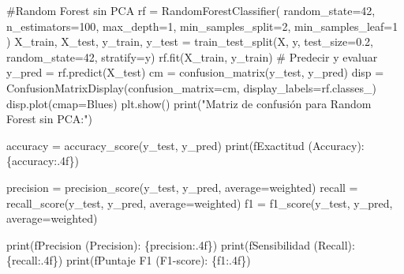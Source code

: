 \documentclass[
  letterpaper,
  DIV=11,
  numbers=noendperiod]{scrartcl}
\newenvironment{Shaded}{\begin{snugshade}}{\end{snugshade}}
\newcommand{\BuiltInTok}[1]{\textcolor[rgb]{0.00,0.23,0.31}{#1}}
\newcommand{\CommentTok}[1]{\textcolor[rgb]{0.37,0.37,0.37}{#1}}
\newcommand{\DecValTok}[1]{\textcolor[rgb]{0.68,0.00,0.00}{#1}}
\newcommand{\FloatTok}[1]{\textcolor[rgb]{0.68,0.00,0.00}{#1}}
\newcommand{\NormalTok}[1]{\textcolor[rgb]{0.00,0.23,0.31}{#1}}
\newcommand{\OperatorTok}[1]{\textcolor[rgb]{0.37,0.37,0.37}{#1}}
\newcommand{\SpecialCharTok}[1]{\textcolor[rgb]{0.37,0.37,0.37}{#1}}
\newcommand{\SpecialStringTok}[1]{\textcolor[rgb]{0.13,0.47,0.30}{#1}}
\newcommand{\StringTok}[1]{\textcolor[rgb]{0.13,0.47,0.30}{#1}}
\begin{document}
\begin{Shaded}
\begin{Highlighting}[]
\CommentTok{\#Random Forest sin PCA}
\NormalTok{rf }\OperatorTok{=}\NormalTok{ RandomForestClassifier(}
\NormalTok{  random\_state}\OperatorTok{=}\DecValTok{42}\NormalTok{, n\_estimators}\OperatorTok{=}\DecValTok{100}\NormalTok{,}
\NormalTok{  max\_depth}\OperatorTok{=}\DecValTok{1}\NormalTok{,}
\NormalTok{  min\_samples\_split}\OperatorTok{=}\DecValTok{2}\NormalTok{,}
\NormalTok{  min\_samples\_leaf}\OperatorTok{=}\DecValTok{1}
\NormalTok{)}
\NormalTok{X\_train, X\_test, y\_train, y\_test }\OperatorTok{=}
\NormalTok{  train\_test\_split(X, y, test\_size}\OperatorTok{=}\FloatTok{0.2}\NormalTok{, random\_state}\OperatorTok{=}\DecValTok{42}\NormalTok{, stratify}\OperatorTok{=}\NormalTok{y)}
\NormalTok{rf.fit(X\_train, y\_train)}
\CommentTok{\# Predecir y evaluar}
\NormalTok{y\_pred }\OperatorTok{=}\NormalTok{ rf.predict(X\_test)}
\NormalTok{cm }\OperatorTok{=}\NormalTok{ confusion\_matrix(y\_test, y\_pred)}
\NormalTok{disp }\OperatorTok{=}\NormalTok{ ConfusionMatrixDisplay(confusion\_matrix}\OperatorTok{=}\NormalTok{cm, display\_labels}\OperatorTok{=}\NormalTok{rf.classes\_)}
\NormalTok{disp.plot(cmap}\OperatorTok{=}\StringTok{\textquotesingle{}Blues\textquotesingle{}}\NormalTok{)}
\NormalTok{plt.show()}
\BuiltInTok{print}\NormalTok{(}\StringTok{"Matriz de confusión para Random Forest sin PCA:"}\NormalTok{)}

\NormalTok{accuracy }\OperatorTok{=}\NormalTok{ accuracy\_score(y\_test, y\_pred)}
\BuiltInTok{print}\NormalTok{(}\SpecialStringTok{f\textquotesingle{}Exactitud (Accuracy): }\SpecialCharTok{\{}\NormalTok{accuracy}\SpecialCharTok{:.4f\}}\SpecialStringTok{\textquotesingle{}}\NormalTok{)}

\NormalTok{precision }\OperatorTok{=}\NormalTok{ precision\_score(y\_test, y\_pred, average}\OperatorTok{=}\StringTok{\textquotesingle{}weighted\textquotesingle{}}\NormalTok{)}
\NormalTok{recall }\OperatorTok{=}\NormalTok{ recall\_score(y\_test, y\_pred, average}\OperatorTok{=}\StringTok{\textquotesingle{}weighted\textquotesingle{}}\NormalTok{)}
\NormalTok{f1 }\OperatorTok{=}\NormalTok{ f1\_score(y\_test, y\_pred, average}\OperatorTok{=}\StringTok{\textquotesingle{}weighted\textquotesingle{}}\NormalTok{)}

\BuiltInTok{print}\NormalTok{(}\SpecialStringTok{f\textquotesingle{}Precision (Precision): }\SpecialCharTok{\{}\NormalTok{precision}\SpecialCharTok{:.4f\}}\SpecialStringTok{\textquotesingle{}}\NormalTok{)}
\BuiltInTok{print}\NormalTok{(}\SpecialStringTok{f\textquotesingle{}Sensibilidad (Recall): }\SpecialCharTok{\{}\NormalTok{recall}\SpecialCharTok{:.4f\}}\SpecialStringTok{\textquotesingle{}}\NormalTok{)}
\BuiltInTok{print}\NormalTok{(}\SpecialStringTok{f\textquotesingle{}Puntaje F1 (F1{-}score): }\SpecialCharTok{\{}\NormalTok{f1}\SpecialCharTok{:.4f\}}\SpecialStringTok{\textquotesingle{}}\NormalTok{)}
\end{Highlighting}
\end{Shaded}
\end{document}
